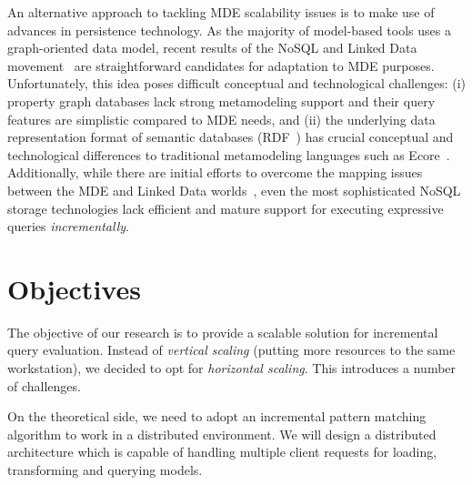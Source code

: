 An alternative approach to tackling MDE scalability issues is to make use of advances in persistence technology. As the majority of model-based tools uses a graph-oriented data model, recent results of the NoSQL and Linked Data movement~\cite{neo4j,openvirtuoso,sesame} are straightforward candidates for adaptation to MDE purposes. Unfortunately, this idea poses difficult conceptual and technological challenges: (i) property graph databases lack strong metamodeling support and their query features are simplistic compared to MDE needs, and (ii) the underlying data representation format of semantic databases (RDF~\cite{website:rdf_standard}) has crucial conceptual and technological differences to traditional metamodeling languages such as Ecore~\cite{EMF}. Additionally, while there are initial efforts to overcome the mapping issues between the MDE and Linked Data worlds~\cite{hillairet2008bridging}, even the most sophisticated NoSQL storage technologies lack efficient and mature support for executing expressive queries \emph{incrementally}.



\section{Objectives}

The objective of our research is to provide a scalable solution for incremental query evaluation. Instead of \emph{vertical scaling} (putting more resources to the same workstation), we decided to opt for \emph{horizontal scaling}. This introduces a number of challenges.

On the theoretical side, we need to adopt an incremental pattern matching algorithm to work in a distributed environment. We will design a distributed architecture which is capable of handling multiple client requests for loading, transforming and querying models.
 
